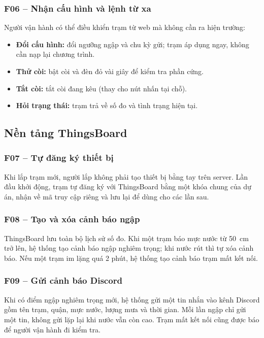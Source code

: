 \documentclass[12pt,a4paper]{article}
\begin{document}
\subsubsection{F06 -- Nhận cấu hình và lệnh từ xa}\label{sec:f06}
Người vận hành có thể điều khiển trạm từ web mà không cần ra hiện trường:
\begin{itemize}
  \item \textbf{Đổi cấu hình:} đổi ngưỡng ngập và chu kỳ gửi; trạm áp dụng ngay, không cần nạp lại chương trình.
  \item \textbf{Thử còi:} bật còi và đèn đỏ vài giây để kiểm tra phần cứng.
  \item \textbf{Tắt còi:} tắt còi đang kêu (thay cho nút nhấn tại chỗ).
  \item \textbf{Hỏi trạng thái:} trạm trả về số đo và tình trạng hiện tại.
\end{itemize}

\subsection{Nền tảng ThingsBoard}

\subsubsection{F07 -- Tự đăng ký thiết bị}\label{sec:f07}
Khi lắp trạm mới, người lắp không phải tạo thiết bị bằng tay trên server. Lần đầu khởi động, trạm tự đăng ký với ThingsBoard bằng một khóa chung của dự án, nhận về mã truy cập riêng và lưu lại để dùng cho các lần sau.

\subsubsection{F08 -- Tạo và xóa cảnh báo ngập}\label{sec:f08}
ThingsBoard lưu toàn bộ lịch sử số đo. Khi một trạm báo mực nước từ 50~cm trở lên, hệ thống tạo cảnh báo ngập nghiêm trọng; khi nước rút thì tự xóa cảnh báo. Nếu một trạm im lặng quá 2 phút, hệ thống tạo cảnh báo trạm mất kết nối.

\subsubsection{F09 -- Gửi cảnh báo Discord}\label{sec:f09}
Khi có điểm ngập nghiêm trọng mới, hệ thống gửi một tin nhắn vào kênh Discord gồm tên trạm, quận, mực nước, lượng mưa và thời gian. Mỗi lần ngập chỉ gửi một tin, không gửi lặp lại khi nước vẫn còn cao. Trạm mất kết nối cũng được báo để người vận hành đi kiểm tra.
\end{document}
